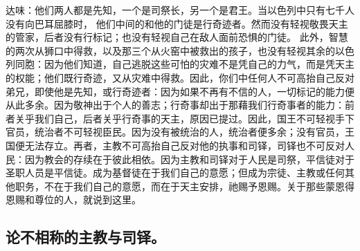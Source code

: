 {达味}：他们两人都是先知，一个是司祭长，另一个是君王。当以色列中只有七千人没有向巴耳屈膝时， 他们中间的和他的门徒是行奇迹者。然而没有轻视敬畏天主的管家，后者没有行标记；也没有轻视自己在敌人面前恐惧的门徒。 此外，智慧的两次从狮口中得救，以及那三个从火窑中被救出的孩子，也没有轻视其余的以色列同胞：因为他们知道，自己逃脱这些可怕的灾难不是凭自己的力气，而是凭天主的权能；他们既行奇迹，又从灾难中得救。因此，你们中任何人不可高抬自己反对弟兄，即使他是先知，或行奇迹者：因为如果不再有不信的人，一切标记的能力便从此多余。因为敬神出于个人的善志；行奇事却出于那藉我们行奇事者的能力：前者关乎我们自己，后者关乎行奇事的天主，原因已提过。因此，国王不可轻视手下官员，统治者不可轻视臣民。因为没有被统治的人，统治者便多余；没有官员，王国便无法存立。再者，主教不可高抬自己反对他的执事和司铎，司铎也不可反对人民：因为教会的存续在于彼此相依。因为主教和司铎对于人民是司祭，平信徒对于圣职人员是平信徒。成为基督徒在于我们自己的意愿；但成为宗徒、主教或任何其他职务，不在于我们自己的意愿，而在于天主安排，祂赐予恩赐。关于那些蒙恩得恩赐和尊位的人，就说到这里。\par


\subsection{论不相称的主教与司铎。}

